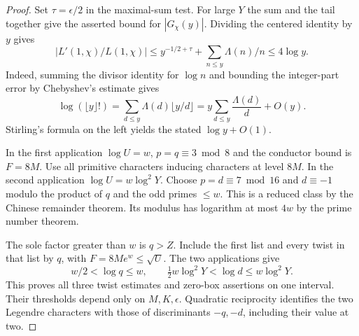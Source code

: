 \begin{proof}
Set \(\tau=\epsilon/2\) in the maximal-sum test. For large \(Y\)
the sum and the tail together give the asserted bound for
\(|G_\chi(y)|\). Dividing the centered identity by \(y\) gives
\[
 |L'(1,\chi)/L(1,\chi)|\le
 y^{-1/2+\tau}+\sum_{n\le y}\Lambda(n)/n\le4\log y .
\]
Indeed, summing the divisor identity for \(\log n\) and bounding
the integer-part error by Chebyshev's estimate gives
\begin{equation}\label{eq:factorial-mangoldt-bound}
 \log(\lfloor y\rfloor !)
 =\sum_{d\le y}\Lambda(d)\lfloor y/d\rfloor
 =y\sum_{d\le y}\frac{\Lambda(d)}d+O(y).
\end{equation}
Stirling's formula on the left yields the stated \(\log y+O(1)\).

In the first application \(\log U=w\), \(p=q\equiv3\bmod8\)
and the conductor bound is \(F=8M\). Use all primitive
characters inducing characters at level \(8M\).
In the second application \(\log U=w\log^2Y\). Choose
\(p=d\equiv7\bmod16\) and \(d\equiv-1\) modulo the product
of \(q\) and the odd primes \(\le w\). This is a reduced class
by the Chinese remainder theorem. Its modulus has logarithm
at most \(4w\) by the prime number theorem.

The sole factor
greater than \(w\) is \(q>Z\). Include the first list and every
twist in that list by \(q\), with \(F=8M e^w\le\sqrt U\).
The two applications give
\[
 w/2<\log q\le w,\qquad \tfrac12 w\log^2Y<\log d\le w\log^2Y.
\]
This proves all three twist estimates and zero-box assertions on
one interval. Their thresholds depend only on \(M,K,\epsilon\).
Quadratic reciprocity identifies the two Legendre characters
with those of discriminants \(-q,-d\), including their value at
two.
\end{proof}
